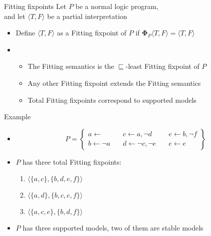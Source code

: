 \begin{frame}{Fitting fixpoints}
  \bigskip
  Let $P$ be a normal logic program,\\ and
  let $\langle T,F \rangle$ be a partial interpretation
  \medskip
  \begin{itemize}
  \item<1-> Define
    $\langle T,F \rangle$ as a \alert{Fitting fixpoint} of $P$
    if
    ${\mathbf{\Phi}}_P\langle T,F \rangle = \langle T,F \rangle$
  \medskip
  \item<2-> []
    \begin{itemize}
    \item The Fitting semantics is the $\sqsubseteq$-least Fitting fixpoint of $P$
    \item Any other Fitting fixpoint extends the Fitting semantics
    \item Total Fitting fixpoints correspond to supported models
    \end{itemize}
  \end{itemize}
\end{frame}
\begin{frame}{Example}
  \bigskip
  \begin{itemize}
  \item<1-> []
    \[
    P
    =
    \left\{
      \begin{array}{lll}
        a \leftarrow                  \quad &
        c \leftarrow a, \neg d       \quad &
        e \leftarrow b, \neg f
        \\
        b \leftarrow \neg a          \quad &
        d \leftarrow \neg c, \neg e \quad &
        e \leftarrow e
      \end{array}
    \right\}
    \]
    \bigskip
  \item<2-> $P$ has three total Fitting fixpoints\pause[3]:
    \begin{enumerate}
    \item<3-> $\langle \{a,c\}, \{b,d,e,f\} \rangle$
    \item<3-> $\langle \{a,d\}, \{b,c,e,f\} \rangle$
    \item<3-> $\langle \{a,c,e\}, \{b,d,f\} \rangle$
    \end{enumerate}
    \medskip
  \item <4-> $P$ has three supported models, two of them are stable models
  \end{itemize}

\end{frame}
